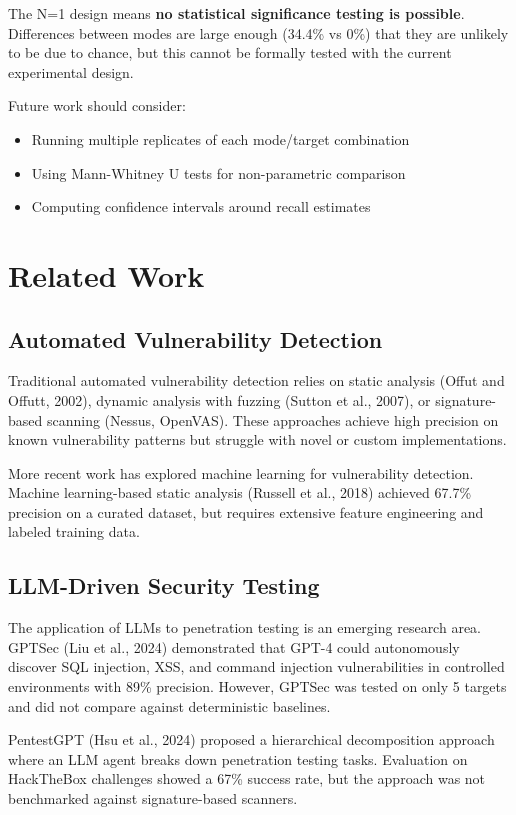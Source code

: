 \documentclass[12pt,a4paper,oneside]{book}
\begin{document}
The N=1 design means \textbf{no statistical significance testing is possible}. Differences between modes are large enough (34.4\% vs 0\%) that they are unlikely to be due to chance, but this cannot be formally tested with the current experimental design.

Future work should consider:
\begin{itemize}
    \item Running multiple replicates of each mode/target combination
    \item Using Mann-Whitney U tests for non-parametric comparison
    \item Computing confidence intervals around recall estimates
\end{itemize}

\chapter{Related Work}

\section{Automated Vulnerability Detection}

Traditional automated vulnerability detection relies on static analysis (Offut and Offutt, 2002), dynamic analysis with fuzzing (Sutton et al., 2007), or signature-based scanning (Nessus, OpenVAS). These approaches achieve high precision on known vulnerability patterns but struggle with novel or custom implementations.

More recent work has explored machine learning for vulnerability detection. Machine learning-based static analysis (Russell et al., 2018) achieved 67.7\% precision on a curated dataset, but requires extensive feature engineering and labeled training data.

\section{LLM-Driven Security Testing}

The application of LLMs to penetration testing is an emerging research area. GPTSec (Liu et al., 2024) demonstrated that GPT-4 could autonomously discover SQL injection, XSS, and command injection vulnerabilities in controlled environments with 89\% precision. However, GPTSec was tested on only 5 targets and did not compare against deterministic baselines.

PentestGPT (Hsu et al., 2024) proposed a hierarchical decomposition approach where an LLM agent breaks down penetration testing tasks. Evaluation on HackTheBox challenges showed a 67\% success rate, but the approach was not benchmarked against signature-based scanners.
\end{document}
